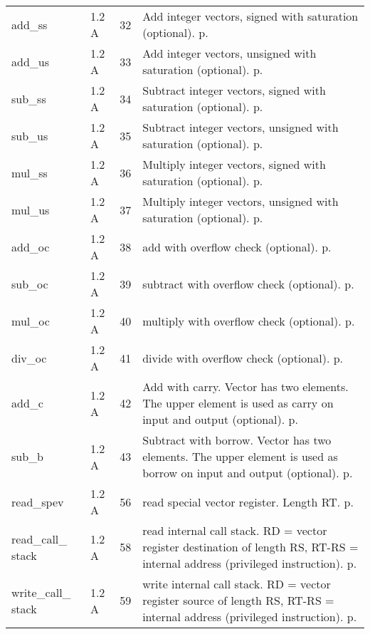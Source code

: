 \documentclass[forwardcom.tex]{subfiles}
\begin{document}
\begin{longtable} {|p{25mm}|p{14mm}|p{10mm}|p{95mm}|}
add\_ss       & 1.2 A & 32 & Add integer vectors, signed with saturation (optional). p. \pageref{table:addSsInstruction} \\
add\_us       & 1.2 A & 33 & Add integer vectors, unsigned with saturation (optional). p. \pageref{table:addUsInstruction} \\
sub\_ss       & 1.2 A & 34 & Subtract integer vectors, signed with saturation (optional). p. \pageref{table:subSsInstruction} \\
sub\_us       & 1.2 A & 35 & Subtract integer vectors, unsigned with saturation (optional). p. \pageref{table:addUsInstruction} \\
mul\_ss       & 1.2 A & 36 & Multiply integer vectors, signed with saturation (optional). p. \pageref{table:mulSsInstruction} \\
mul\_us       & 1.2 A & 37 & Multiply integer vectors, unsigned with saturation (optional). p. \pageref{table:mulUsInstruction} \\
add\_oc       & 1.2 A & 38 & add with overflow check (optional). p. \pageref{table:addOcInstruction} \\
sub\_oc       & 1.2 A & 39 & subtract with overflow check (optional). p. \pageref{table:subOcInstruction} \\
mul\_oc       & 1.2 A & 40 & multiply with overflow check (optional). p. \pageref{table:mulOcInstruction} \\
div\_oc       & 1.2 A & 41 & divide with overflow check (optional). p. \pageref{table:divOcInstruction} \\
add\_c        & 1.2 A & 42 & Add with carry. Vector has two elements. The upper element is used as carry on input and output (optional). p. \pageref{table:addCInstruction} \\
sub\_b        & 1.2 A & 43 & Subtract with borrow. Vector has two elements. The upper element is used as borrow on input and output (optional). p. \pageref{table:subBInstruction} \\

read\_spev    & 1.2 A & 56 & read special vector register. Length RT. p. \pageref{table:readSpevInstruction} \\
read\_call\_ stack & 1.2 A & 58 & read internal call stack. RD = vector register destination of length RS, RT-RS = internal address (privileged instruction). p. \pageref{table:readCallStackInstruction} \\
write\_call\_ stack & 1.2 A & 59 & write internal call stack. RD = vector register source of length RS, RT-RS = internal address (privileged instruction). p. \pageref{table:writeCallStackInstruction} \\


\end{longtable}
\end{document}
